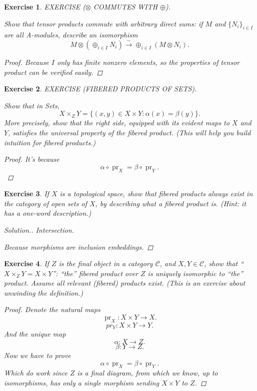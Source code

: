 \documentclass{article}
\theoremstyle{breakstyle}
\newtheorem{exercise}{Exercise}[section]
\newenvironment{solution}
  {\begin{proof}[Solution.]\renewcommand{\qedsymbol}{}}
  {\end{proof}}
\DeclareMathOperator{\pr}{pr}
\begin{document}
\begin{exercise}
EXERCISE ($\otimes$ COMMUTES WITH $\oplus$).

Show that tensor products commute with arbitrary direct sums: if $M$ and
$\{N_{i}\}_{i\in I}$ are all A-modules, describe an isomorphism
$$
M \otimes (\oplus_{i \in I} N_{i}) \xrightarrow{\sim} \oplus_{i \in I}
(M \otimes N_{i}).
$$

\begin{proof}
    Because $I$ only has finite nonzero elements, so the properties of tensor
    product can be verified easily.
\end{proof}

\end{exercise}

\begin{exercise}
EXERCISE (FIBERED PRODUCTS OF SETS).

Show that in Sets,
$$
X \times_{Z} Y = \{(x, y) \in X \times Y: \alpha(x) = \beta(y)\}.
$$
More precisely, show that the right side, equipped with its evident maps to
$X$ and $Y$, satisfies the universal property of the fibered product. (This
will help you build intuition for fibered products.)

\begin{proof}
	It's because
	$$
	\alpha\circ\pr_{X} = \beta\circ\pr_{Y}
	.$$ 
\end{proof}

\end{exercise}

\begin{exercise}
If $X$ is a topological space, show that fibered products always exist in
the category of open sets of $X$, by describing what a fibered product is.
(Hint: it has a one-word description.)

\begin{solution}
    Intersection.

    Because morphisms are inclusion embeddings.
\end{solution}

\end{exercise}

\begin{exercise}
If $Z$ is the final object in a category $\mathcal{C}$, and
$X, Y \in \mathcal{C}$, show that ``$X \times_{Z} Y = X \times Y$'': ``the''
fibered product over $Z$ is uniquely isomorphic to ``the'' product. Assume
all relevant (fibered) products exist. (This is an exercise about unwinding
the definition.)

\begin{proof}
	Denote the natural maps
	$$
	\pr_{X}:X\times Y\longrightarrow X
	.$$ 
	$$
	pr_{Y}:X\times Y\longrightarrow Y
	.$$ 
	And the unique map
	$$
	\alpha:X\longrightarrow Z
	.$$ 
	$$
	\beta:Y\longrightarrow Z
	.$$ 
	Now we have to prove
	$$
	\alpha\circ\pr_{X}=\beta\circ\pr_{Y}
	.$$ 
    Which do work since $Z$ is a final diagram, from which we know, up to
    isomorphisms, has only a single morphism sending $X\times Y$ to $Z$.
\end{proof}

\end{exercise}
\end{document}
